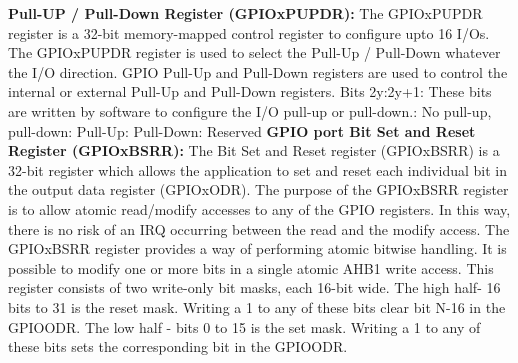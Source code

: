 \documentclass{article}
\begin{document}
\textbf{Pull-UP / Pull-Down Register (GPIOx\textunderscore PUPDR): } The GPIOx\textunderscore PUPDR register is a 32-bit memory-mapped control register to configure upto 16 I/Os. The GPIOx\textunderscore PUPDR register is used to select the Pull-Up / Pull-Down whatever the I/O direction. GPIO Pull-Up and Pull-Down registers are used to control the internal or external Pull-Up and Pull-Down registers.
Bits 2y:2y+1:\newline\newline
These bits are written by software to configure the I/O pull-up or pull-down.\newline{}: No pull-up, pull-down\newline{}: Pull-Up\newline{}: Pull-Down\newline{}: Reserved\newline\newline
\textbf{GPIO port Bit Set and Reset Register (GPIOx\textunderscore BSRR): }
The Bit Set and Reset register (GPIOx\textunderscore BSRR) is a 32-bit register which allows the application to set and reset each individual bit in the output data register (GPIOx\textunderscore ODR). The purpose of the GPIOx\textunderscore BSRR register is to allow atomic read/modify accesses to any of the GPIO registers. In this way, there is no risk of an IRQ occurring between the read and the modify access. The GPIOx\textunderscore BSRR register provides a way of performing atomic bitwise handling. It is possible to modify one or more bits in a single atomic AHB1 write access. This register consists of two write-only bit masks, each 16-bit wide. The high half- 16 bits to 31 is the reset mask. Writing a 1 to any of these bits clear bit N-16 in the GPIO\textunderscore ODR. The low half - bits 0 to 15 is the set mask. Writing a 1 to any of these bits sets the corresponding bit in the GPIO\textunderscore ODR.\newline\newline
\end{document}
